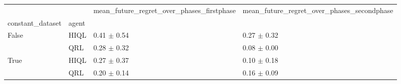 \begin{tabular}{llll}
\toprule
 &  & mean_future_regret_over_phases_firstphase & mean_future_regret_over_phases_secondphase \\
constant_dataset & agent &  &  \\
\midrule
\multirow[t]{2}{*}{False} & HIQL & 0.41 $\pm$ 0.54 & 0.27 $\pm$ 0.32 \\
 & QRL & 0.28 $\pm$ 0.32 & 0.08 $\pm$ 0.00 \\
\cline{1-4}
\multirow[t]{2}{*}{True} & HIQL & 0.27 $\pm$ 0.37 & 0.10 $\pm$ 0.18 \\
 & QRL & 0.20 $\pm$ 0.14 & 0.16 $\pm$ 0.09 \\
\cline{1-4}
\bottomrule
\end{tabular}
